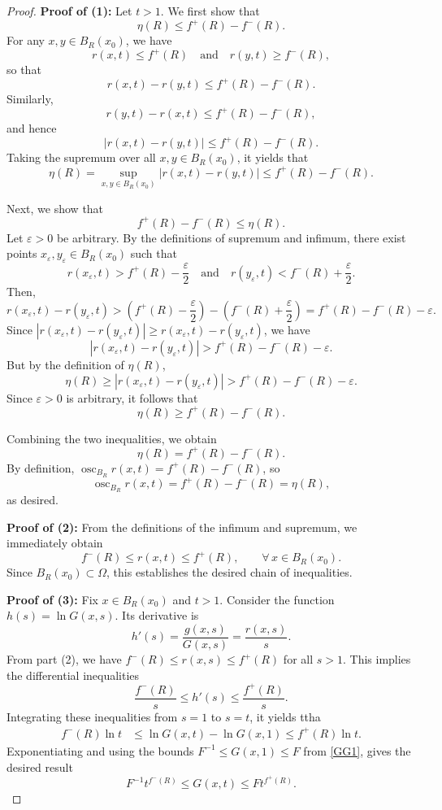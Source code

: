 \documentclass[10pt,reqno]{amsart}
\newcommand *\w{^\wedge}
\theoremstyle{definition}
\numberwithin{equation}{section}
\begin{document}
\begin{proof}
\textbf{Proof of (1):} Let $t>1$. We first show that $$\eta(R) \leq f^+(R) - f^-(R).$$
For any $x, y \in B_R(x_0)$, we have
\[
r(x,t) \leq f^+(R) \quad \text{and} \quad r(y,t) \geq f^-(R),
\]
so that
\[
r(x,t) - r(y,t) \leq f^+(R) - f^-(R).
\]
Similarly,
\[
r(y,t) - r(x,t) \leq f^+(R) - f^-(R),
\]
and hence
\[
|r(x,t) - r(y,t)| \leq f^+(R) - f^-(R).
\]
Taking the supremum over all $x, y \in B_R(x_0)$, it yields that
\[
\eta(R) = \sup_{x,y \in B_R(x_0)} |r(x,t) - r(y,t)| \leq f^+(R) - f^-(R).
\]

Next, we show that $$f^+(R) - f^-(R) \leq \eta(R).$$ 
Let $\varepsilon > 0$ be arbitrary. By the definitions of supremum and infimum, there exist points $x_\varepsilon, y_\varepsilon \in B_R(x_0)$ such that
\[
r(x_\varepsilon, t) > f^+(R) - \frac{\varepsilon}{2} \quad \text{and} \quad r(y_\varepsilon, t) < f^-(R) + \frac{\varepsilon}{2}.
\]
Then,
\[
r(x_\varepsilon, t) - r(y_\varepsilon, t) > \left(f^+(R) - \frac{\varepsilon}{2}\right) - \left(f^-(R) + \frac{\varepsilon}{2}\right) = f^+(R) - f^-(R) - \varepsilon.
\]
Since $|r(x_\varepsilon, t) - r(y_\varepsilon, t)| \geq r(x_\varepsilon, t) - r(y_\varepsilon, t)$, we have
\[
|r(x_\varepsilon, t) - r(y_\varepsilon, t)| > f^+(R) - f^-(R) - \varepsilon.
\]
But by the definition of $\eta(R)$,
\[
\eta(R) \geq |r(x_\varepsilon, t) - r(y_\varepsilon, t)| > f^+(R) - f^-(R) - \varepsilon.
\]
Since $\varepsilon > 0$ is arbitrary, it follows that
\[
\eta(R) \geq f^+(R) - f^-(R).
\]

Combining the two inequalities, we obtain
\[
\eta(R) = f^+(R) - f^-(R).
\]
By definition, $\operatorname{osc}_{B_R} r(x,t) = f^+(R) - f^-(R)$, so
\[
\operatorname{osc}_{B_R} r(x,t) = f^+(R) - f^-(R) = \eta(R),
\]
as desired.


\textbf{Proof of (2):}
 From the definitions of the infimum and supremum, we immediately obtain  
\[
f^-(R) \leq r(x,t) \leq f^+(R), \qquad \forall\, x \in B_R(x_0).
\]  
Since $B_R(x_0)\subset \Omega$, this establishes the desired chain of inequalities.

\textbf{Proof of (3):}
Fix $x \in B_R(x_0)$ and $t > 1$. Consider the function $h(s) = \ln G(x, s)$. Its derivative is
\[
h'(s) = \frac{g(x, s)}{G(x, s)} = \frac{r(x, s)}{s}.
\]
From part (2), we have $f^-(R) \leq r(x, s) \leq f^+(R)$ for all $s > 1$. This implies the differential inequalities
\[
\frac{f^-(R)}{s} \leq h'(s) \leq \frac{f^+(R)}{s}.
\]
Integrating these inequalities from $s=1$ to $s=t$, it yields ttha
\begin{align*}
f^-(R) \ln t &\leq \ln G(x, t) - \ln G(x, 1) \leq f^+(R) \ln t.
\end{align*}
Exponentiating and using the bounds $F^{-1} \leq G(x, 1) \leq F$ from \eqref{GG1}, gives the desired result
\[
F^{-1} t^{f^-(R)} \leq G(x, t) \leq F t^{f^+(R)}.
\]


\end{proof}
\end{document}
